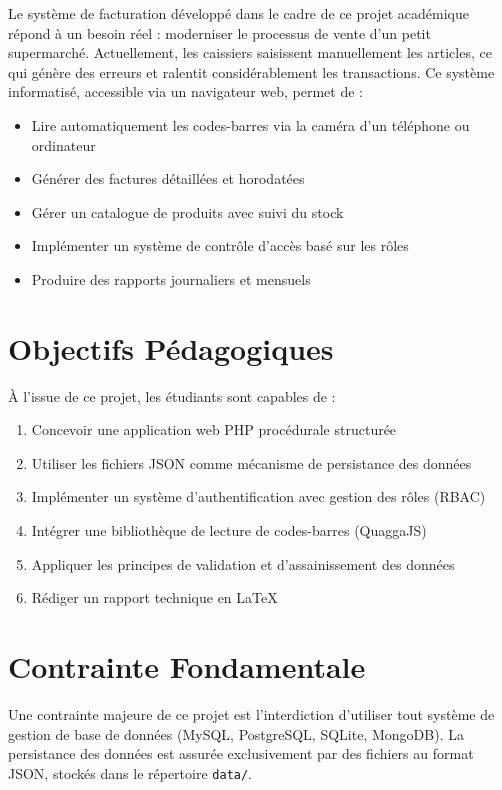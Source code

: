 \documentclass[12pt,a4paper]{report}
\begin{document}
Le système de facturation développé dans le cadre de ce projet académique répond à un besoin réel : moderniser le processus de vente d'un petit supermarché. Actuellement, les caissiers saisissent manuellement les articles, ce qui génère des erreurs et ralentit considérablement les transactions. Ce système informatisé, accessible via un navigateur web, permet de :

\begin{itemize}
    \item Lire automatiquement les codes-barres via la caméra d'un téléphone ou ordinateur
    \item Générer des factures détaillées et horodatées
    \item Gérer un catalogue de produits avec suivi du stock
    \item Implémenter un système de contrôle d'accès basé sur les rôles
    \item Produire des rapports journaliers et mensuels
\end{itemize}

\section{Objectifs Pédagogiques}

À l'issue de ce projet, les étudiants sont capables de :

\begin{enumerate}
    \item Concevoir une application web PHP procédurale structurée
    \item Utiliser les fichiers JSON comme mécanisme de persistance des données
    \item Implémenter un système d'authentification avec gestion des rôles (RBAC)
    \item Intégrer une bibliothèque de lecture de codes-barres (QuaggaJS)
    \item Appliquer les principes de validation et d'assainissement des données
    \item Rédiger un rapport technique en \LaTeX{}
\end{enumerate}

\section{Contrainte Fondamentale}

Une contrainte majeure de ce projet est l'interdiction d'utiliser tout système de gestion de base de données (MySQL, PostgreSQL, SQLite, MongoDB). La persistance des données est assurée exclusivement par des fichiers au format JSON, stockés dans le répertoire \texttt{data/}.
\end{document}

